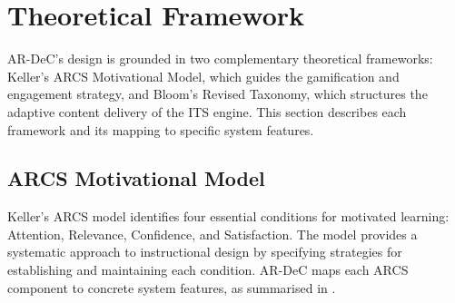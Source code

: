 
\section{Theoretical Framework}
\label{sec:framework}

AR-DeC's design is grounded in two complementary theoretical frameworks: Keller's ARCS Motivational Model, which guides the gamification and engagement strategy, and Bloom's Revised Taxonomy, which structures the adaptive content delivery of the ITS engine. This section describes each framework and its mapping to specific system features.

\subsection{ARCS Motivational Model}
\label{subsec:arcs}

Keller's ARCS model \cite{keller2010} identifies four essential conditions for motivated learning: Attention, Relevance, Confidence, and Satisfaction. The model provides a systematic approach to instructional design by specifying strategies for establishing and maintaining each condition. AR-DeC maps each ARCS component to concrete system features, as summarised in .


